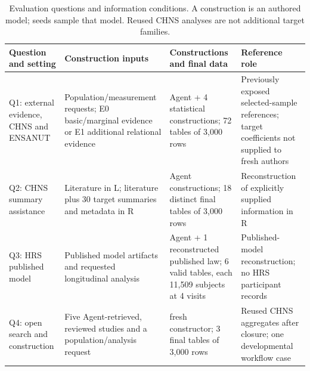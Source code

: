 \documentclass[10pt,twocolumn]{article}
\begin{document}
\begin{table}[t]

\caption{Evaluation questions and information conditions. A construction is an authored model; seeds sample that model. Reused CHNS analyses are not additional target families.}

\label{tab:1}

\centering\fontsize{8}{9.5}\selectfont

\setlength{\tabcolsep}{4pt}

\renewcommand{\arraystretch}{1.12}

\begin{tabularx}{\textwidth}{@{}>{\raggedright\arraybackslash}X>{\raggedright\arraybackslash}X>{\raggedright\arraybackslash}X>{\raggedright\arraybackslash}X@{}}

\toprule

Question and setting & Construction inputs & Constructions and final data & Reference role \\

\midrule

Q1: external evidence, CHNS and ENSANUT & Population/measurement requests; E0 basic/marginal evidence or E1 additional relational evidence & 20 Agent + 4 statistical constructions; 72 tables of 3,000 rows & Previously exposed selected-sample references; target coefficients not supplied to fresh authors \\

Q2: CHNS summary assistance & Literature in L; literature plus 30 target summaries and metadata in R & 6 Agent constructions; 18 distinct final tables of 3,000 rows & Reconstruction of explicitly supplied information in R \\

Q3: HRS published model & Published model artifacts and requested longitudinal analysis & 1 Agent + 1 reconstructed published law; 6 valid tables, each 11,509 subjects at 4 visits & Published-model reconstruction; no HRS participant records \\

Q4: open search and construction & Five Agent-retrieved, reviewed studies and a population/analysis request & 1 fresh constructor; 3 final tables of 3,000 rows & Reused CHNS aggregates after closure; one developmental workflow case \\

\bottomrule

\end{tabularx}

\end{table}
\end{document}
